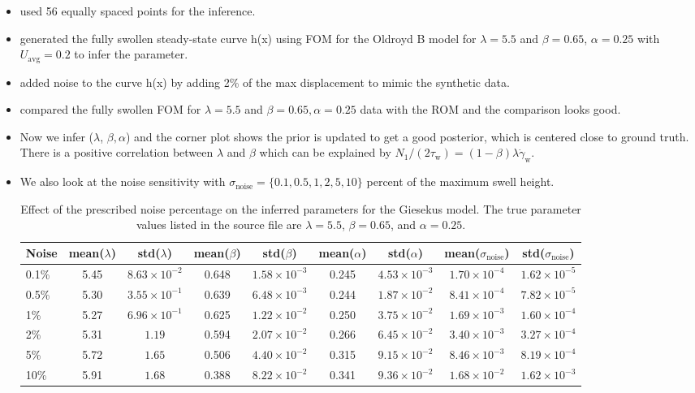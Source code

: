\documentclass{elsarticle}
\begin{document}
\begin{itemize}
\item used 56 equally spaced points for the inference.
    \item generated the fully swollen steady-state curve h(x) using FOM for the Oldroyd B model for $\lambda = 5.5$ and $\beta = 0.65$, $\alpha = 0.25$ with $U_\text{avg} = 0.2$ to infer the parameter.
    \item added noise to the curve h(x) by adding 2\% of the max displacement to mimic the synthetic data.
    \item compared the fully swollen FOM for $\lambda = 5.5$ and $\beta = 0.65, \alpha = 0.25$ data with the ROM and the comparison looks good.
    \item Now we infer ($\lambda$, $\beta, \alpha$) and the corner plot shows the prior is updated to get a good posterior, which is centered close to ground truth. There is a positive correlation between $\lambda$ and $\beta$ which can be explained by $N_1/(2 \tau_{\text{w}}) = (1 -\beta) \lambda \dot{\gamma}_{\text{w}}$.

    \item We also look at the noise sensitivity with $\sigma_{\text{noise}} = \{0.1, 0.5, 1, 2, 5, 10\}$ percent of the maximum swell height.
\begin{table}[htbp]
\centering
\small
\begin{tabular}{lcccccccc}
\toprule
Noise &
mean($\lambda$) & std($\lambda$) &
mean($\beta$) & std($\beta$) &
mean($\alpha$) & std($\alpha$) &
mean($\sigma_{\mathrm{noise}}$) & std($\sigma_{\mathrm{noise}}$) \\
\midrule
0.1\%  & 5.45 & $8.63 \times 10^{-2}$ & 0.648 & $1.58 \times 10^{-3}$ & 0.245 & $4.53 \times 10^{-3}$ & $1.70 \times 10^{-4}$ & $1.62 \times 10^{-5}$ \\
0.5\%  & 5.30 & $3.55 \times 10^{-1}$ & 0.639 & $6.48 \times 10^{-3}$ & 0.244 & $1.87 \times 10^{-2}$ & $8.41 \times 10^{-4}$ & $7.82 \times 10^{-5}$ \\
1\%    & 5.27 & $6.96 \times 10^{-1}$ & 0.625 & $1.22 \times 10^{-2}$ & 0.250 & $3.75 \times 10^{-2}$ & $1.69 \times 10^{-3}$ & $1.60 \times 10^{-4}$ \\
2\%    & 5.31 & $1.19$                  & 0.594 & $2.07 \times 10^{-2}$ & 0.266 & $6.45 \times 10^{-2}$ & $3.40 \times 10^{-3}$ & $3.27 \times 10^{-4}$ \\
5\%    & 5.72 & $1.65$                  & 0.506 & $4.40 \times 10^{-2}$ & 0.315 & $9.15 \times 10^{-2}$ & $8.46 \times 10^{-3}$ & $8.19 \times 10^{-4}$ \\
10\%   & 5.91 & $1.68$                  & 0.388 & $8.22 \times 10^{-2}$ & 0.341 & $9.36 \times 10^{-2}$ & $1.68 \times 10^{-2}$ & $1.62 \times 10^{-3}$ \\
\bottomrule
\end{tabular}
\caption{Effect of the prescribed noise percentage on the inferred parameters for the Giesekus model. The true parameter values listed in the source file are $\lambda = 5.5$, $\beta = 0.65$, and $\alpha = 0.25$.}
\label{tab:giesekus-noise-sensitivity}
\end{table}


\end{itemize}
\end{document}
